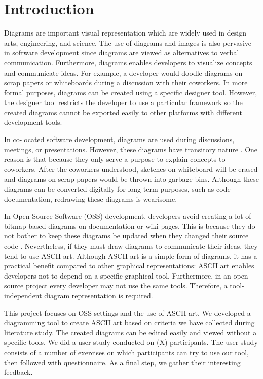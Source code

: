\documentclass{sig-alternate}
\begin{document}
\section{Introduction}
\label{introduction}

Diagrams are important visual representation which are widely used in design arts, engineering, and science. The use of diagrams and images is also pervasive in software development since diagrams are viewed as alternatives to verbal communication. Furthermore, diagrams enables developers to visualize concepts and communicate ideas. For example, a developer would doodle diagrams on scrap papers or whiteboards during a discussion with their coworkers. In more formal purposes, diagrams can be created using a specific designer tool. However, the designer tool restricts the developer to use a particular framework so the created diagrams cannot be exported easily to other platforms with different development tools.

In co-located software development, diagrams are used during discussions, meetings, or presentations. However, these diagrams have transitory nature \cite{Cherubini2007}. One reason is that because they only serve a purpose to explain concepts to coworkers. After the coworkers understood, sketches on whiteboard will be erased and diagrams on scrap papers would be thrown into garbage bins. Although these diagrams can be converted digitally for long term purposes, such as code documentation, redrawing these diagrams is wearisome. 

In Open Source Software (OSS) development, developers avoid creating a lot of bitmap-based diagrams on documentation or wiki pages. This is because they do not bother to keep these diagrams be updated when they changed their source code \cite{Yatani2009}. Nevertheless, if they must draw diagrams to communicate their ideas, they tend to use ASCII art. Although ASCII art is a simple form of diagrams, it has a practical benefit compared to other graphical representations: ASCII art enables developers not to depend on a specific graphical tool. Furthermore, in an open source project every developer may not use the same tools. Therefore, a tool-independent diagram representation is required. 

This project focuses on OSS settings and the use of ASCII art. We developed a diagramming tool to create ASCII art based on criteria we have collected during literature study. The created diagrams can be edited easily and viewed without a specific tools. We did a user study conducted on (X) participants. The user study consists of a number of exercises on which participants can try to use our tool, then followed with questionnaire. As a final step, we gather their interesting feedback.
\end{document}
